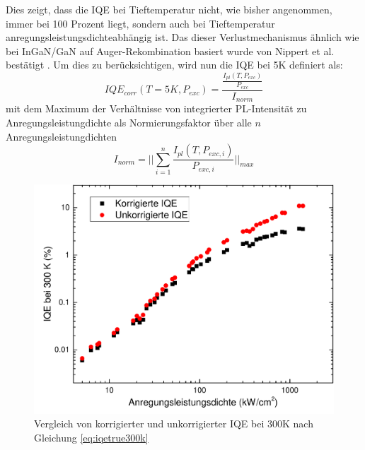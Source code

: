 \vspace{0.1cm}
\noindent
\newline
Dies zeigt, dass die IQE bei Tieftemperatur nicht, wie bisher angenommen, immer bei 100 Prozent liegt, sondern auch bei Tieftemperatur anregungsleistungsdichteabhängig ist. Das dieser Verlustmechanismus ähnlich wie bei InGaN/GaN auf Auger-Rekombination basiert wurde von Nippert et al. bestätigt \cite{doi:10.1063/1.4965298}. 
Um dies zu berücksichtigen, wird nun die IQE bei 5K definiert als:
\begin{equation}
    IQE_{corr}(T = 5K, P_{exc}) = \frac{ \frac{I_{pl}(T,P_{exc}) }{P_{exc} } } { I_{norm}}
    \label{eq:iqetrue5k}
\end{equation}
mit dem Maximum der Verhältnisse von integrierter PL-Intensität zu Anregungsleistungdichte als  Normierungsfaktor über alle $n$ Anregungsleistungdichten
\begin{equation}
    I_{norm} = \lvert \lvert \sum_{i=1}^{n} \frac{I_{pl}(T,P_{exc,i})}{P_{exc,i}} \lvert \lvert_{max}
    \label{eq:iplnorm}
\end{equation}
\noindent
\begin{figure}[htb]
\centering
    \begin{minipage}[t]{0.49\linewidth}
        \includegraphics[width=\linewidth]{Bilder/korrigierteIQE300K.pdf}
        \caption{Vergleich von korrigierter und unkorrigierter IQE bei 300K nach Gleichung \ref{eq:iqetrue300k} }
        \label{fig:trueiqe300k}
    \end{minipage}
\end{figure}
\noindent
\newline
